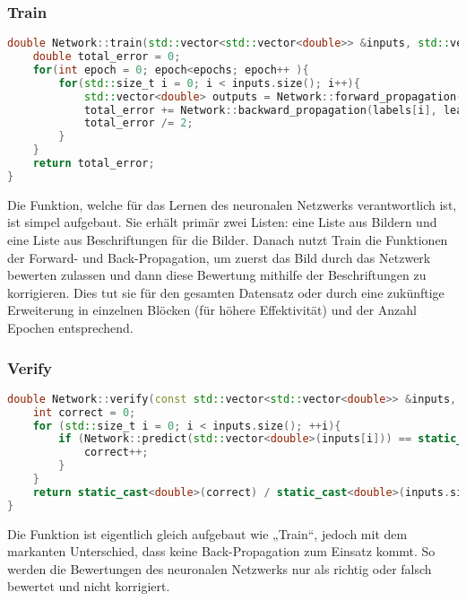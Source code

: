 \subsubsection{Train}
\label{sec:RealTrainCode}
\begin{lstlisting}[language=C++]
double Network::train(std::vector<std::vector<double>> &inputs, std::vector<double> &labels, int epochs, double learning_rate){
    double total_error = 0;
    for(int epoch = 0; epoch<epochs; epoch++ ){
        for(std::size_t i = 0; i < inputs.size(); i++){
            std::vector<double> outputs = Network::forward_propagation(inputs[i]);
            total_error += Network::backward_propagation(labels[i], learning_rate);
            total_error /= 2;
        }
    }
    return total_error;
}

\end{lstlisting}
Die Funktion, welche für das Lernen des neuronalen Netzwerks verantwortlich ist, ist simpel aufgebaut. Sie erhält primär zwei Listen: eine Liste aus Bildern und eine Liste aus Beschriftungen für die Bilder. Danach nutzt Train die Funktionen der Forward- und Back-Propagation, um zuerst das Bild durch das Netzwerk bewerten zulassen und dann diese Bewertung mithilfe der Beschriftungen zu korrigieren. Dies tut sie für den gesamten Datensatz oder durch eine zukünftige Erweiterung in einzelnen Blöcken (für höhere Effektivität) und der Anzahl Epochen entsprechend.

\subsubsection{Verify}
\label{sec:RealVerifyCode}
\begin{lstlisting}[language=C++]
double Network::verify(const std::vector<std::vector<double>> &inputs, const std::vector<double> &labels){
    int correct = 0;
    for (std::size_t i = 0; i < inputs.size(); ++i){
        if (Network::predict(std::vector<double>(inputs[i])) == static_cast<int>(labels[i])){
            correct++;
        }
    }
    return static_cast<double>(correct) / static_cast<double>(inputs.size());
}
\end{lstlisting}
Die Funktion ist eigentlich gleich aufgebaut wie „Train“, jedoch mit dem markanten Unterschied, dass keine Back-Propagation zum Einsatz kommt. So werden die Bewertungen des neuronalen Netzwerks nur als richtig oder falsch bewertet und nicht korrigiert.

